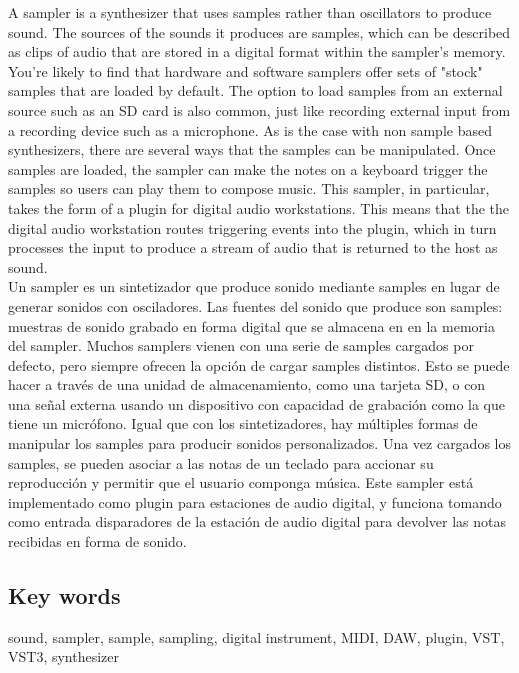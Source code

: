 \documentclass[12pt , a4paper]{article}
\begin{document}
	\begin{multicols}{2}
	A sampler is a synthesizer that uses samples rather than oscillators to produce sound.  The sources of the sounds it produces are samples, which can be described as clips of audio that are stored in a digital format within the sampler's memory. You're likely to find that hardware and software samplers offer sets of "stock" samples that are loaded by default. The option to load samples from an external source such as an SD card is also common, just like recording external input from a recording device such as a microphone. As is the case with non sample based synthesizers, there are several ways that the samples can be manipulated. Once samples are loaded, the sampler can make the notes on a keyboard trigger the samples so users can play them to compose music. This sampler, in particular, takes the form of a plugin for digital audio workstations. This means that the the digital audio workstation routes triggering events into the plugin, which in turn processes the input to produce a stream of audio that is returned to the host as sound.\\


	Un sampler es un sintetizador que produce sonido mediante samples en lugar de generar sonidos con osciladores. Las fuentes del sonido que produce son samples: muestras de sonido grabado en forma digital que se almacena en en la memoria del sampler. Muchos samplers vienen con una serie de samples cargados por defecto, pero siempre ofrecen la opción de cargar samples distintos. Esto se puede hacer a través de una unidad de almacenamiento, como una tarjeta SD, o con una señal externa usando un dispositivo con capacidad de grabación como la que tiene un micrófono. Igual que con los sintetizadores, hay múltiples formas de manipular los samples para producir sonidos personalizados. Una vez cargados los samples, se pueden asociar a las notas de un teclado para accionar su reproducción y permitir que el usuario componga música. Este sampler está implementado como plugin para estaciones de audio digital, y funciona tomando como entrada disparadores de la estación de audio digital para devolver las notas recibidas en forma de sonido. 
	\end{multicols}
	\subsection{Key words}
	sound, sampler, sample, sampling, digital instrument, MIDI, DAW, plugin, VST, VST3, synthesizer\\
\end{document}
